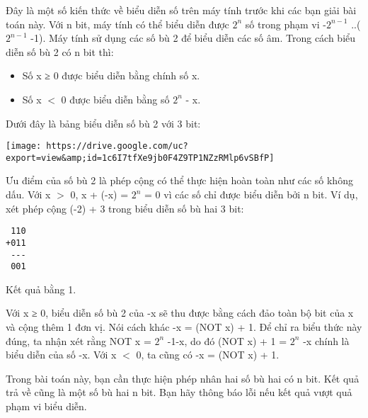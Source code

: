 Đây là một số kiến thức về biểu diễn số trên máy tính trước khi các bạn giải bài toán này. Với n bit, máy tính có thể biểu diễn được $2^{n}$ số trong phạm vi -$2^{n-1}$ ..($2^{n-1}$ -1). Máy tính sử dụng các số bù 2 để biểu diễn các số âm. Trong cách biểu diễn số bù 2 có n bit thì:
\begin{itemize}
	\item Số x ≥ 0 được biểu diễn bằng chính số x.
	\item Số x $<$ 0 được biểu diễn bằng số $2^{n}$ - x.
\end{itemize}

Dưới đây là bảng biểu diễn số bù 2 với 3 bit:


\texttt{[image: https://drive.google.com/uc?export=view\&amp;id=1c6I7tfXe9jb0F4Z9TP1NZzRMlp6vSBfP]}

Ưu điểm của số bù 2 là phép cộng có thể thực hiện hoàn toàn như các số không dấu. Với x $>$ 0, x + (-x) = $2^{n}$ = 0 vì các số chỉ được biểu diễn bởi n bit. Ví dụ, xét phép cộng (-2) + 3 trong biểu diễn số bù hai 3 bit:
\begin{verbatim}
 110
+011
 ---
 001
\end{verbatim}

Kết quả bằng 1.

Với x ≥ 0, biểu diễn số bù 2 của -x sẽ thu được bằng cách đảo toàn bộ bit của x và cộng thêm 1 đơn vị. Nói cách khác -x = (NOT x) + 1. Để chỉ ra biểu thức này đúng, ta nhận xét rằng NOT x = $2^{n}$ -1-x, do đó (NOT x) + 1 = $2^{n}$ -x chính là biểu diễn của số -x. Với x $<$ 0, ta cũng có -x = (NOT x) + 1.

Trong bài toán này, bạn cần thực hiện phép nhân hai số bù hai có n bit. Kết quả trả về cũng là một số bù hai n bit. Bạn hãy thông báo lỗi nếu kết quả vượt quả phạm vi biểu diễn.